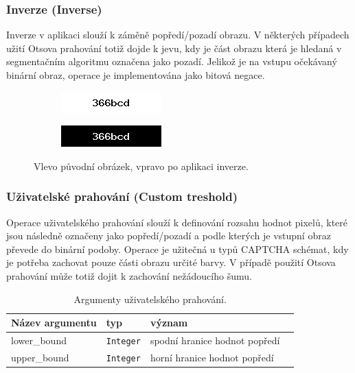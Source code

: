 \documentclass[
  field=ainfp,
  master=true,
  biblatex,
  sourcecodes=false,
  theorems=false,
  glossaries,
  index
]{kidiplom}
\begin{document}
\subsubsection*{Inverze (Inverse)}
Inverze v aplikaci slouží k záměně popředí/pozadí obrazu. V některých případech užití Otsova prahování totiž dojde k jevu, kdy je část obrazu která je hledaná v segmentačním algoritmu označena jako pozadí. Jelikož je na vstupu očekávaný binární obraz, operace je implementována jako bitová negace.
\begin{figure}[H]
\centering
\begin{subfigure}{.5\textwidth}
  \centering
  \includegraphics[width=.8\linewidth]{images/inverse_original.png}
\end{subfigure}%
\begin{subfigure}{.5\textwidth}
  \centering
  \includegraphics[width=.8\linewidth]{images/inverse_result.png}
\end{subfigure}
\caption{Vlevo původní obrázek, vpravo po aplikaci inverze.}
\label{fig:inverse_example}
\end{figure}

\subsubsection*{Uživatelské prahování (Custom treshold)}
Operace uživatelského prahování slouží k definování rozsahu hodnot pixelů, které jsou následně označeny jako popředí/pozadí a podle kterých je vstupní obraz převede do binární podoby. Operace je užitečná u typů CAPTCHA schémat, kdy je potřeba zachovat pouze části obrazu určité barvy. V případě použití Otsova prahování může totiž dojit k zachování nežádoucího šumu.

\begin{table}[H]
\centering
\begin{tabular}{|l|l|l|l|}
\hline
\textbf{Název argumentu} & \textbf{typ} & \textbf{význam}
\\ \hline
lower\_bound & \texttt{Integer} & spodní hranice hodnot popředí
\\ \hline
upper\_bound & \texttt{Integer} & horní hranice hodnot popředí
\\ \hline
\end{tabular}
\caption{Argumenty uživatelského prahování.}
\end{table}
\end{document}
